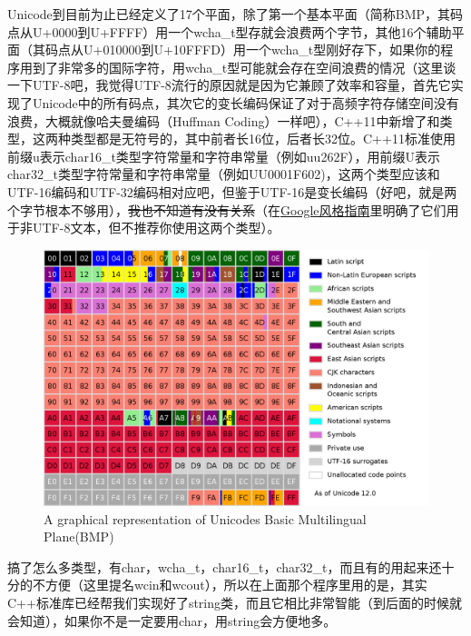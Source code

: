 Unicode到目前为止已经定义了17个平面，除了第一个基本平面（简称BMP，其码点从U+0000到U+FFFF）用一个wcha\_t型存就会浪费两个字节，其他16个辅助平面（其码点从U+010000到U+10FFFD）用一个wcha\_t型刚好存下，如果你的程序用到了非常多的国际字符，用wcha\_t型可能就会存在空间浪费的情况（这里谈一下UTF-8吧，我觉得UTF-8流行的原因就是因为它兼顾了效率和容量，首先它实现了Unicode中的所有码点，其次它的变长编码保证了对于高频字符存储空间没有浪费，大概就像哈夫曼编码（Huffman Coding）一样吧），C++11中新增了和类型，这两种类型都是无符号的，其中前者长16位，后者长32位。C++11标准使用前缀u表示char16\_t类型字符常量和字符串常量（例如u\leftqm\mybackslash u262F\rightqm），用前缀U表示char32\_t类型字符常量和字符串常量（例如U\leftqm\mybackslash U0001F602\rightqm)，这两个类型应该和UTF-16编码和UTF-32编码相对应吧，但鉴于UTF-16是变长编码（好吧，就是两个字节根本不够用），\sout{我也不知道有没有关系}（在\href{https://github.com/google/styleguide}{Google风格指南}里明确了它们用于非UTF-8文本，但不推荐你使用这两个类型）。

\begin{figure}[!hbt]
\centering
\includegraphics[scale=0.3]{./Figures/Unicode BMP}
\caption{A graphical representation of Unicode\rightqm s Basic Multilingual Plane(BMP)}
\label{figure:Unicode BMP}
\end{figure}

搞了怎么多类型，有char，wcha\_t，char16\_t，char32\_t，而且有的用起来还十分的不方便（这里提名wcin和wcout），所以在上面那个程序里用的是，其实C++标准库已经帮我们实现好了string类，而且它相比非常智能（到后面的时候就会知道），如果你不是一定要用char，用string会方便地多。


